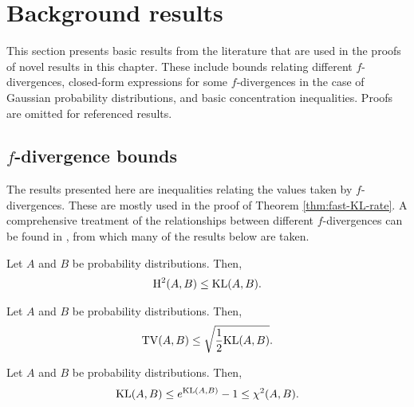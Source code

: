 \section{Background results}\label{sec:f-div-background}

This section presents basic results from the literature that are used in the proofs of novel results in this chapter.
These include bounds relating different $f$-divergences, closed-form expressions for some $f$-divergences in the case of Gaussian probability distributions, and basic concentration inequalities. 
Proofs are omitted for referenced results.


\subsection{$f$-divergence bounds}

The results presented here are inequalities relating the values taken by $f$-divergences. 
These are mostly used in the proof of Theorem \ref{thm:fast-KL-rate}.
A comprehensive treatment of the relationships between different $f$-divergences can be found in \cite{tsybakov2009}, from which many of the results below are taken.

\medskip

\begin{lemma}\label{lemma:f-div-hleqkl}
Let $A$ and $B$ be probability distributions. Then,
\begin{align*}
\mathrm{H}^2(A, B) \leq \mathrm{KL}(A,B).
\end{align*}
\end{lemma}

\medskip

\begin{lemma}\label{lemma:f-div-pinsker}
Let $A$ and $B$ be probability distributions. Then,
\begin{align*}
\mathrm{TV}(A,B)  \leq \sqrt{\frac{1}{2}\mathrm{KL}(A, B)}.
\end{align*}
\end{lemma}

\medskip

\begin{lemma}\label{lemma:f-div-klleqchi}
Let $A$ and $B$ be probability distributions. Then,
\begin{align*}
\mathrm{KL}(A,B) \leq e^{\mathrm{KL}(A, B)} - 1 \leq \chi^2(A, B).
\end{align*}
\end{lemma}


